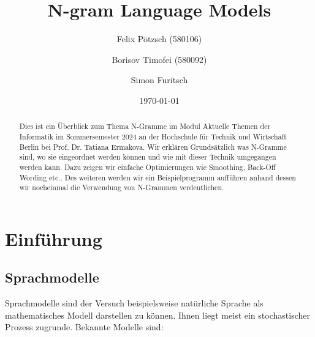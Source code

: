 \documentclass[12pt]{article}
\title{N-gram Language Models}
\author{
  Felix Pötzsch (580106)\\
  \and
  Borisov Timofei (580092) \\
  \and
  Simon Furitsch\\
}
\date{\today}
\begin{document}
\maketitle

\begin{abstract}
	Dies ist ein Überblick zum Thema N-Gramme im Modul 
	Aktuelle Themen der Informatik im Sommersemester 2024 an der 
	Hochschule für Technik und Wirtschaft Berlin bei Prof. Dr. Tatiana Ermakova.
	Wir erklären Grundsätzlich was N-Gramme sind, wo sie eingeordnet werden können und wie mit dieser Technik umgegangen werden kann. 
	Dazu zeigen wir einfache Optimierungen wie Smoothing, Back-Off Wording etc.. 
	Des weiteren werden wir ein Beispielprogramm aufführen anhand dessen wir nocheinmal 
	die Verwendung von N-Grammen verdeutlichen.
\end{abstract}

\tableofcontents
\clearpage

\section{Einführung}

\subsection{Sprachmodelle}
Sprachmodelle sind der Versuch beispielsweise natürliche Sprache als mathematisches 
Modell darstellen zu können. Ihnen liegt meist ein stochastischer Prozess zugrunde. 
Bekannte Modelle sind:
\end{document}
